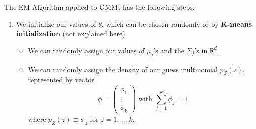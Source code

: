   \begin{algo}
    The EM Algorithm applied to GMMs has the following steps:

    \begin{enumerate}
      \item We initialize our values of $\theta$, which can be chosen randomly or by \textbf{K-means initialization} (not explained here).
      \begin{itemize}
        \item We can randomly assign our values of $\mu_j$'s and the $\Sigma_j$'s in $\mathbb{R}^d$.
        \item We can randomly assign the density of our guess multinomial $p_Z(z)$, represented by vector
        \[\phi = \begin{pmatrix} \phi_1 \\ \vdots \\ \phi_k \end{pmatrix} \text{ with } \sum_{j=1}^k \phi_j = 1\]
        where $p_Z(z) \equiv \phi_z$ for $z = 1, \ldots, k$.
      \end{itemize}


\end{enumerate}
\end{algo}
